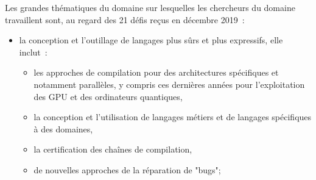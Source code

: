 \documentclass[11pt]{article}
\begin{document}
Les grandes thématiques du domaine sur lesquelles les chercheurs du
domaine travaillent sont, au regard des 21 défis reçus en décembre 2019~: 
\begin{itemize}
  \renewcommand{\labelitemi}{$\bullet$}
\begin{itemize}
\item l'ingénierie des exigences et de leurs interactions avec les artefacts logiciels pour assurer la traçabilité logicielle, y compris dans des objectifs d'argumentation et de validation de la justesse des systèmes produits, 
\item la séparation et la composition de préoccupations, par exemple la sécurité, pour maîtriser la conception, le développement et l'évolution de grands systèmes, 
\item la modélisation et la gestion de la variabilité logicielle à des fins de production, de configuration et de maintenance de lignes de produits logiciels;
\end{itemize}

\item la conception et l'outillage de langages plus sûrs et plus expressifs,  elle inclut~: 
\begin{itemize}
\item les approches de compilation pour des architectures spécifiques et notamment parallèles, y compris ces dernières années pour l'exploitation des GPU et  des ordinateurs quantiques,
\item la conception et l'utilisation de langages métiers et de langages spécifiques à des domaines,
\item la certification des chaînes de compilation,
\item de nouvelles approches de la réparation de "bugs";
\end{itemize}


\end{itemize}
\end{document}
